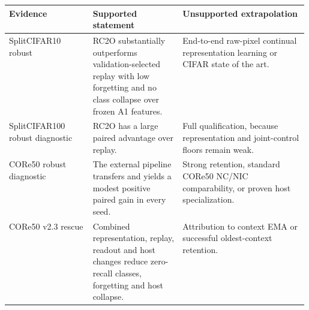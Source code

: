 \begin{tabularx}{\linewidth}{@{}p{0.28\linewidth} p{0.30\linewidth} X@{}}
\toprule
Evidence & Supported statement & Unsupported extrapolation \\
\midrule
SplitCIFAR10 robust & RC2O substantially outperforms validation-selected replay with low forgetting and no class collapse over frozen A1 features. & End-to-end raw-pixel continual representation learning or CIFAR state of the art. \\
SplitCIFAR100 robust diagnostic & RC2O has a large paired advantage over replay. & Full qualification, because representation and joint-control floors remain weak. \\
CORe50 robust diagnostic & The external pipeline transfers and yields a modest positive paired gain in every seed. & Strong retention, standard CORe50 NC/NIC comparability, or proven host specialization. \\
CORe50 v2.3 rescue & Combined representation, replay, readout and host changes reduce zero-recall classes, forgetting and host collapse. & Attribution to context EMA or successful oldest-context retention. \\
\bottomrule
\end{tabularx}
